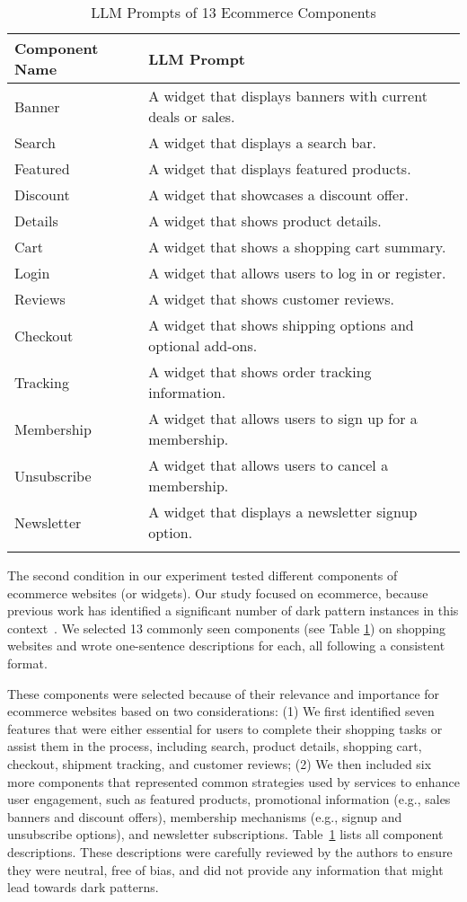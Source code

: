 \begin{table}
  \begin{tabular}{l l}
    \toprule
    {Component Name}&LLM Prompt\\
    \midrule
    Banner & A widget that displays banners with current deals or sales.\\
    Search & A widget that displays a search bar.\\
    Featured & A widget that displays featured products.\\
    Discount & A widget that showcases a discount offer.\\
    Details & A widget that shows product details.\\
    Cart & A widget that shows a shopping cart summary.\\
    Login & A widget that allows users to log in or register.\\
    Reviews & A widget that shows customer reviews.\\
    Checkout & A widget that shows shipping options and optional add-ons.\\
    Tracking & A widget that shows order tracking information.\\
    Membership & A widget that allows users to sign up for a membership.\\
    Unsubscribe & A widget that allows users to cancel a membership.\\
    Newsletter & A widget that displays a newsletter signup option.\\
  \bottomrule \\
\end{tabular}
  \caption{LLM Prompts of 13 Ecommerce Components}
\label{tab:widgetdescriptions}
\end{table}

The second condition in our experiment tested different components of ecommerce websites (or widgets). Our study focused on ecommerce, because previous work has identified a significant number of dark pattern instances in this context~\cite{a:9}. We selected 13 commonly seen components (see Table \ref{tab:widgetdescriptions}) on shopping websites and wrote one-sentence descriptions for each, all following a consistent format. 

These components were selected because of their relevance and importance for ecommerce websites based on two considerations: (1) We first identified seven features that were either essential for users to complete their shopping tasks or assist them in the process, including search, product details, shopping cart, checkout, shipment tracking, and customer reviews; (2) We then included six more components that represented common strategies used by services to enhance user engagement, such as featured products, promotional information (e.g., sales banners and discount offers), membership mechanisms (e.g., signup and unsubscribe options), and newsletter subscriptions.
Table~\ref{tab:widgetdescriptions} lists all component descriptions. These descriptions were carefully reviewed by the authors to ensure they were neutral, free of bias, and did not provide any information that might lead towards dark patterns.


